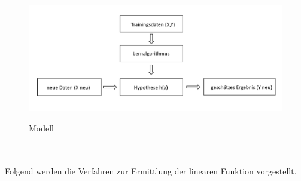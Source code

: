 \documentclass[a4paper]{scrreprt}
\begin{document}
%
\begin{figure}[h]
\centering
\includegraphics[scale=.75]{Abbildungen/Lineare_Regression_00}
\label{Lernmodell}
\caption{Modell}
\end{figure}
\\\\
Folgend werden die Verfahren zur Ermittlung der linearen Funktion vorgestellt.\newline
\end{document}
